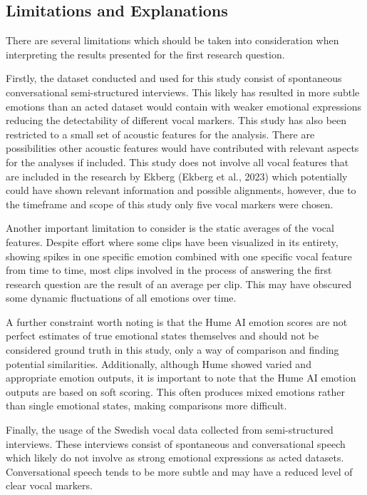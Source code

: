 \subsection{Limitations and Explanations}
There are several limitations which should be taken into consideration when interpreting the results presented for the first research question.

Firstly, the dataset conducted and used for this study consist of spontaneous conversational semi-structured interviews. This likely has resulted in more subtle emotions than an acted dataset would contain with weaker emotional expressions reducing the detectability of different vocal markers. 
This study has also been restricted to a small set of acoustic features for the analysis. There are possibilities other acoustic features would have contributed with relevant aspects for the analyses if included. This study does not involve all vocal features that are included in the research by Ekberg (Ekberg et al., 2023) which potentially could have shown relevant information and possible alignments, however, due to the timeframe and scope of this study only five vocal markers were chosen.

Another important limitation to consider is the static averages of the vocal features. Despite effort where some clips have been visualized in its entirety, showing spikes in one specific emotion combined with one specific vocal feature from time to time, most clips involved in the process of answering the first research question are the result of an average per clip. This may have obscured some dynamic fluctuations of all emotions over time.

A further constraint worth noting is that the Hume AI emotion scores are not perfect estimates of true emotional states themselves and should not be considered ground truth in this study, only a way of comparison and finding potential similarities. Additionally, although Hume showed varied and appropriate emotion outputs, it is important to note that the Hume AI emotion outputs are based on soft scoring. This often produces mixed emotions rather than single emotional states, making comparisons more difficult.

Finally, the usage of the Swedish vocal data collected from semi-structured interviews. These interviews consist of spontaneous and conversational speech which likely do not involve as strong emotional expressions as acted datasets. Conversational speech tends to be more subtle and may have a reduced level of clear vocal markers. 

